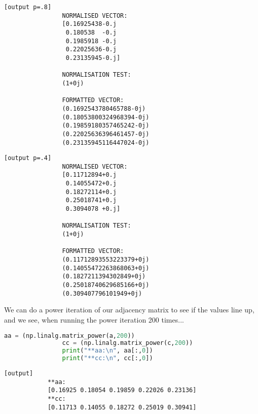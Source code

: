 \documentclass[11pt]{article}
\begin{document}
\begin{enumerate}
        \begin{minipage}[t]{0.48\linewidth}
            \begin{lstlisting}[basicstyle=\ttfamily\footnotesize, gobble=8]
            [output p=.8]
                NORMALISED VECTOR:
                [0.16925438-0.j 
                 0.180538  -0.j 
                 0.1985918 -0.j 
                 0.22025636-0.j 
                 0.23135945-0.j] 

                NORMALISATION TEST:
                (1+0j)
                
                FORMATTED VECTOR:
                (0.1692543780465788-0j)
                (0.18053800324968394-0j)
                (0.19859180357465242-0j)
                (0.22025636396461457-0j)
                (0.23135945116447024-0j)
            \end{lstlisting}
        \end{minipage} \hfill \vline \hfill%
        \begin{minipage}[t]{0.48\linewidth}
            \begin{lstlisting}[basicstyle=\ttfamily\footnotesize, gobble=8]
            [output p=.4]
                NORMALISED VECTOR:
                [0.11712894+0.j 
                 0.14055472+0.j 
                 0.18272114+0.j 
                 0.25018741+0.j
                 0.3094078 +0.j] 

                NORMALISATION TEST:
                (1+0j)
                
                FORMATTED VECTOR:
                (0.11712893553223379+0j)
                (0.14055472263868063+0j)
                (0.1827211394302849+0j)
                (0.25018740629685166+0j)
                (0.309407796101949+0j)
            \end{lstlisting}
        \end{minipage}

        We can do a power iteration of our adjacency matrix to see if the
        values line up, and we see, when running the power iteration 200
        times...

        \begin{lstlisting}[style=mystyle, linewidth=0.94\linewidth, 
                            language=Python, gobble=9, caption=Power iteration]
                aa = (np.linalg.matrix_power(a,200))
                cc = (np.linalg.matrix_power(c,200))
                print("**aa:\n", aa[:,0])
                print("**cc:\n", cc[:,0])
        \end{lstlisting}
        \begin{lstlisting}[basicstyle=\ttfamily\footnotesize]
        [output]
            **aa:
            [0.16925 0.18054 0.19859 0.22026 0.23136]
            **cc:
            [0.11713 0.14055 0.18272 0.25019 0.30941]
        \end{lstlisting}


\end{enumerate}
\end{document}

